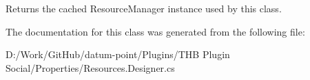 Returns the cached Resource\+Manager instance used by this class. 



The documentation for this class was generated from the following file\+:\begin{DoxyCompactItemize}
\item 
D\+:/\+Work/\+Git\+Hub/datum-\/point/\+Plugins/\+T\+H\+B Plugin Social/\+Properties/Resources.\+Designer.\+cs\end{DoxyCompactItemize}
